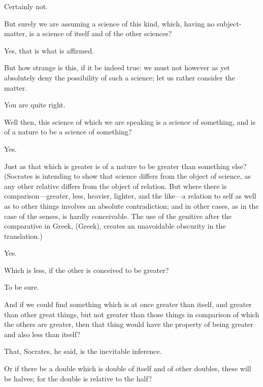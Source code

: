 \documentclass[11pt,letter]{article}
\begin{document}
\par  Certainly not.

\par  But surely we are assuming a science of this kind, which, having no subject-matter, is a science of itself and of the other sciences?

\par  Yes, that is what is affirmed.

\par  But how strange is this, if it be indeed true: we must not however as yet absolutely deny the possibility of such a science; let us rather consider the matter.

\par  You are quite right.

\par  Well then, this science of which we are speaking is a science of something, and is of a nature to be a science of something?

\par  Yes.

\par  Just as that which is greater is of a nature to be greater than something else? (Socrates is intending to show that science differs from the object of science, as any other relative differs from the object of relation. But where there is comparison—greater, less, heavier, lighter, and the like—a relation to self as well as to other things involves an absolute contradiction; and in other cases, as in the case of the senses, is hardly conceivable. The use of the genitive after the comparative in Greek, (Greek), creates an unavoidable obscurity in the translation.)

\par  Yes.

\par  Which is less, if the other is conceived to be greater?

\par  To be sure.

\par  And if we could find something which is at once greater than itself, and greater than other great things, but not greater than those things in comparison of which the others are greater, then that thing would have the property of being greater and also less than itself?

\par  That, Socrates, he said, is the inevitable inference.

\par  Or if there be a double which is double of itself and of other doubles, these will be halves; for the double is relative to the half?
\end{document}

